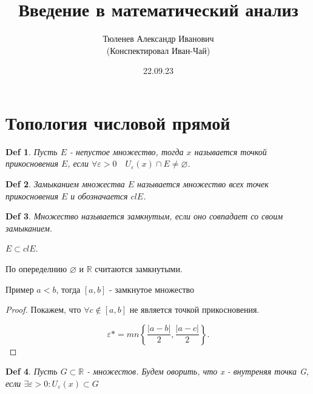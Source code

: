 \documentclass[a6paper, 10pt]{article}
\theoremstyle{plain}
\newtheorem{definition}{Def}
\newcommand{\R}{\mathbb R}
\newcommand{\eps}{\varepsilon}
\begin{document}
	\author{Тюленев Александр Иванович\\(Конспектировал Иван-Чай)}
	\date{22.09.23}
	\title{Введение в математический анализ}

	\linespread{1.4}
	\selectfont

	\maketitle
	\newpage

	\tableofcontents

    \section{Топология числовой прямой}

    \begin{definition}
        Пусть $ E $ - непустое множество, тогда $ x $ называется точкой прикосновения
        $ E $, если $ \forall \eps > 0 \quad U_{\eps}(x) \cap E \neq \varnothing $.
    \end{definition}

    \begin{definition}
        Замыканием множества $ E $ называется множество всех точек прикосновения $ E $
        и обозначается $ cl E $.
    \end{definition}

    \begin{definition}
        Множество называется замкнутым, если оно совпадает со своим замыканием.
    \end{definition}

    \begin{remark}
        $ E \subset cl E $.
    \end{remark}

    \begin{remark}
        По опеределнию $ \varnothing $ и $ \R $ считаются замкнутыми.
    \end{remark}

    Пример $ a < b $, тогда $ \left[ a, b \right]  $ - замкнутое множество

    \begin{proof}
        Покажем, что $ \forall c \nin [a, b] $ не является точкой прикосновения.

        \[
            \eps* = mn \left\{ \frac{ | a - b |}{2}, \frac{ | a - c |}{2} \right\}
        .\]
    \end{proof}

    \begin{definition}
        Пусть $ G \subset \R $ - множестов. Будем оворить, что x - внутреняя точка G,
        если $ \exists \eps > 0: U_{\eps}(x) \subset G $
    \end{definition}
\end{document}

